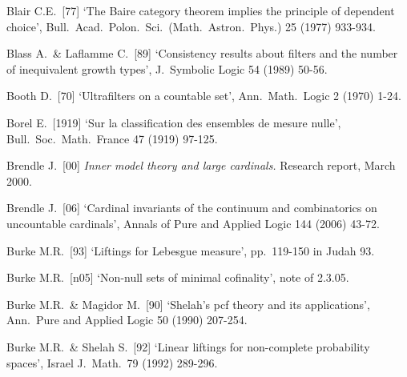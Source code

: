 {Blair C.E.\ [77] `The Baire category theorem implies the principle of
dependent choice', Bull.\ Acad.\ Polon.\ Sci.\ (Math.\ Astron.\ Phys.) 25
(1977) 933-934.
\cmmnt{[\S566 {\it notes\/}.]}



Blass A.\ \& Laflamme C.\ [89] `Consistency results about filters and the
number of inequivalent growth types', J.\ Symbolic Logic 54 (1989) 50-56.
\cmmnt{[5A6Ib, 5A6J.]}

Booth D.\ [70] `Ultrafilters on a countable set',
Ann.\ Math.\ Logic 2 (1970) 1-24.
\cmmnt{[517R.]}

Borel E.\ [1919] `Sur la classification des ensembles de mesure nulle', Bull.\ Soc.\ Math.\ France 47 (1919) 97-125.
\cmmnt{[\S534 {\it intro.}]}

Brendle J.\ [00] {\it Inner model theory and large cardinals.}
Research report, March 2000.
\cmmnt{[528N, 529F-529H.]} %


Brendle J.\ [06] `Cardinal invariants of the continuum and combinatorics
on uncountable cardinals',
Annals of Pure and Applied Logic 144 (2006) 43-72.
\cmmnt{[529F, 529H.]}

Burke M.R.\ [93] `Liftings for Lebesgue measure', pp.\ 119-150 in
{\smc Judah 93}.
\cmmnt{[\S535 {\it notes\/}.]}



Burke M.R.\ [n05] `Non-null sets of minimal cofinality', note of 2.3.05.
\cmmnt{[523K.]}

Burke M.R.\ \& Magidor M.\ [90] `Shelah's pcf theory and
its applications', Ann.\ Pure and Applied Logic 50 (1990) 207-254.
\cmmnt{[513J, \S5A2 {\it intro.}.]}

Burke M.R.\ \& Shelah S.\ [92]
`Linear liftings for non-complete probability spaces',
Israel J.\ Math.\ 79 (1992) 289-296.
\cmmnt{[\S535 {\it notes\/}.]}

}

